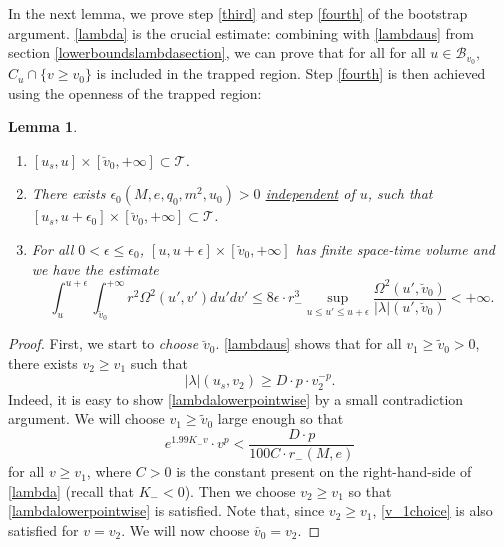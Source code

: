\documentclass[10pt,a4paper]{article}
\theoremstyle{plain}
\newtheorem{lem}[thm]{Lemma}
\theoremstyle{remark}
\theoremstyle{definition}
\theoremstyle{plain}
\theoremstyle{remark}
\theoremstyle{definition}
\numberwithin{equation}{section}
\begin{document}
In the next lemma, we prove step \ref{third} and step \ref{fourth} of the bootstrap argument. \eqref{lambda} is the crucial estimate: combining with \eqref{lambdaus} from section \ref{lowerboundslambdasection}, we can prove that for all for all $u\in \mathcal{B}_{v_0}$, $C_u \cap \{v\geq v_0\}$ is included in the trapped region.	Step \ref{fourth} is then achieved using the openness of the trapped region: 
\begin{lem} \label{trappedlemma}
	
	\begin{enumerate} We choose $\Delta=\Delta(M,e,m^2,q_0,u_0)>0$ and  $\tilde{v}_0=\tilde{v}_0(M,e,m^2,q_0,u_0)$ as in the statement of Lemma \ref{propagation}. Then, there exists  $\breve{v}_0(M,e,m^2,q_0,u_0,s,p) \geq \tilde{v}_0$ such that for all $u\in \mathcal{B}_{\breve{v}_0}$, the following statements are true:
		\item \label{first10}  $[u_s,u] \times [\breve{v}_0,+\infty] \subset \mathcal{T}$.
		
		\item \label{second10} There exists $\epsilon_0(M,e,q_0,m^2,u_0)>0$ \underline{independent} of $u$, such that $[u_s,u+\epsilon_0] \times [\breve{v}_0,+\infty] \subset \mathcal{T}$.
		
		\item \label{third10} For all $0 <\epsilon \leq \epsilon_0$, $[u,u+\epsilon] \times [\breve{v}_0,+\infty]$ has finite space-time volume and we have the estimate $$ \int_{u}^{u+\epsilon} \int_{\breve{v}_0}^{+\infty} r^2 \Omega^2(u',v') du' dv'\leq 8 \epsilon  \cdot r_-^3 \sup_{u \leq u' \leq u+\epsilon} \frac{\Omega^2(u',\breve{v}_0)}{|\lambda|(u',\breve{v}_0)} <+\infty.$$
		
	\end{enumerate}
\end{lem}\begin{proof} First, we start to \textit{choose} $\breve{v}_0$. \eqref{lambdaus} shows that for all $v_1 \geq \tilde{v}_0>0$, there exists $v_2 \geq v_1$ such that \begin{equation} \label{lambdalowerpointwise}
|\lambda|(u_s,v_2) \geq D \cdot p \cdot v_2^{-p}.
\end{equation} 
Indeed, it is easy to show \eqref{lambdalowerpointwise} by a small contradiction argument. We will choose  $v_1 \geq \tilde{v}_0$ large enough so that \begin{equation} \label{v_1choice}
e^{1.99 K_- v} \cdot v^{p} < \frac{ D \cdot p}{100C \cdot r_-(M,e)}
\end{equation} 
for all $v\geq v_1$, where $C>0$ is the constant present on the right-hand-side of \eqref{lambda} (recall that $K_-<0$). Then we choose $v_2 \geq v_1$ so that \eqref{lambdalowerpointwise} is satisfied. Note that, since $v_2 \geq v_1$, \eqref{v_1choice} is also satisfied for $v=v_2$. We will now choose $\breve{v_0}=v_2$.


\end{proof}
\end{document}
